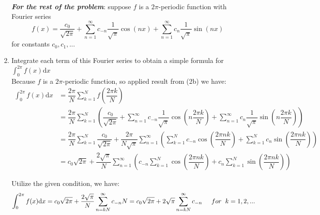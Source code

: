 \documentclass[14pt,a4paper]{article}
\begin{document}
\begin{enumerate}
		\textbf{\textit{For the rest of the problem}}: suppose $f$ is a $2\pi$-periodic function with Fourier series
	$$ f(x) = \dfrac{c_0}{\sqrt{2\pi}} + \sum_{n=1}^{\infty} c_{-n} \dfrac{1}{\sqrt{\pi}}\cos(nx) + \sum_{n=1}^{\infty} c_n \dfrac{1}{\sqrt{\pi}}\sin(nx)$$
	for constants $c_0, c_1, ... $
	\label{2c}
	\item Integrate each term of this Fourier series to obtain a simple formula for $\int_{0}^{2\pi} f(x)\mathrm{d}x$ \\
	Because $f$ is a $2\pi$-periodic function, so applied result from (2b) we have:
	\begin{align*} \int_{0}^{2\pi} f(x)\mathrm{d}x  &= \dfrac{2\pi}{N} \sum_{k=1}^{N} f\left(\dfrac{2\pi k}{N}\right) \\ 
	&= \dfrac{2\pi}{N} \sum_{k=1}^{N} \left( \dfrac{c_0}{\sqrt{2\pi}} + \sum_{n=1}^{\infty} c_{-n} \dfrac{1}{\sqrt{\pi}}\cos(n\dfrac{2\pi k}{N}) + \sum_{n=1}^{\infty} c_n \dfrac{1}{\sqrt{\pi}}\sin(n\dfrac{2\pi k}{N}) \right) \\
	&= \dfrac{2\pi}{N}\sum_{k=1}^{N}\dfrac{c_0}{\sqrt{2\pi}} + \dfrac{2\pi}{N\sqrt{\pi}} \sum_{n=1}^{\infty} \left(\sum_{k=1}^{N}c_{-n}\cos\left(\dfrac{2\pi nk}{N}\right) + \sum_{k=1}^{N}c_n\sin\left(\dfrac{2\pi nk}{N}\right) \right) \\
	&= c_0\sqrt{2\pi} + \dfrac{2\sqrt{\pi}}{N}\sum_{n=1}^{\infty} \left(c_{-n}\sum_{k=1}^{N}\cos\left(\dfrac{2\pi nk}{N}\right) + c_n\sum_{k=1}^{N}\sin\left(\dfrac{2\pi nk}{N}\right) \right) \end{align*}
	
	Utilize the given condition, we have:
	$$ \int_{0}^{2\pi} f(x)\mathrm{d}x = c_0\sqrt{2\pi} + \dfrac{2\sqrt{\pi}}{N}\sum_{n=kN}^{\infty}c_{-n}N = c_0\sqrt{2\pi} + 2\sqrt{\pi} \sum_{n=kN}^{\infty}c_{-n} \hspace{0.5cm} for \hspace{0.2cm} k = 1,2,...$$ %
		

\end{enumerate}
\end{document}
